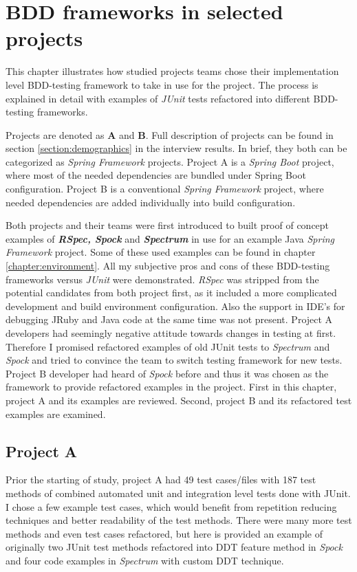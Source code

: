 \chapter{BDD frameworks in selected projects}
\label{chapter:projects}

This chapter illustrates how studied projects teams chose their implementation level BDD-testing
framework to take in use for the project. The process is explained in detail with examples of \textit{JUnit} tests
refactored into different BDD-testing frameworks.

Projects are denoted as \textbf{A} and \textbf{B}. Full description of projects can be found in section \ref{section:demographics} in the interview
results. In brief, they both can be categorized as \textit{Spring Framework} projects. Project A is a \textit{Spring Boot} project, where
most of the needed dependencies are bundled under Spring Boot configuration. Project B is a conventional \textit{Spring Framework} project,
where needed dependencies are added individually into build configuration.

Both projects and their teams were first introduced to built proof of concept examples of \textbf{\textit{RSpec, Spock}} and \textbf{\textit{Spectrum}}
in use for an example Java \textit{Spring Framework} project. Some of these used examples can be found in chapter \ref{chapter:environment}.
All my subjective pros and cons of these BDD-testing frameworks versus \textit{JUnit} were demonstrated. \textit{RSpec} was stripped from the
potential candidates from both project first, as it included a more complicated development and build environment configuration. Also
the support in IDE's for debugging JRuby and Java code at the same time was not present. Project A developers had
seemingly negative attitude towards changes in testing at first. Therefore I promised refactored examples of old JUnit
tests to \textit{Spectrum} and \textit{Spock} and tried to convince the team to switch testing framework for new tests.
Project B developer had heard of \textit{Spock} before and thus it was chosen as the framework to provide refactored examples in the project.
First in this chapter, project A and its examples are reviewed. Second, project B and its refactored test examples are examined.

\label{section:teams}

    \section{Project A}
    Prior the starting of study, project A had 49 test cases/files with 187 test methods of combined automated unit and integration level tests done with JUnit.
    I chose a few example test cases, which would benefit from repetition reducing techniques and better readability of the test methods.
    There were many more test methods and even test cases refactored, but here is provided an example of originally two JUnit
    test methods refactored into DDT feature method in \textit{Spock} and four code examples in \textit{Spectrum} with custom DDT technique.

